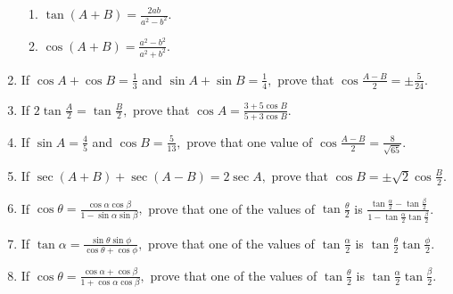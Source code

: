 \begin{enumerate}[resume]
  \begin{enumerate}
  \item $\tan(A + B) = \frac{2ab}{a^2 - b^2}$.
  \item $\cos(A + B) = \frac{a^2 - b^2}{a^2 + b^2}$.
  \end{enumerate}
\item If $\cos A + \cos B = \frac{1}{3}$ and $\sin A + \sin B = \frac{1}{4},$ prove that $\cos \frac{A - B}{2} =
  \pm\frac{5}{24}$.
\item If $2\tan \frac{A}{2} = \tan \frac{B}{2},$ prove that $\cos A = \frac{3 + 5\cos B}{5 + 3\cos B}$.
\item If $\sin A = \frac{4}{5}$ and $\cos B = \frac{5}{13},$ prove that one value of $\cos \frac{A - B}{2} =
  \frac{8}{\sqrt{65}}$.
\item If $\sec(A + B) + \sec(A - B) = 2\sec A,$ prove that $\cos B = \pm \sqrt{2}\cos \frac{B}{2}$.
\item If $\cos \theta = \frac{\cos\alpha\cos\beta}{1 - \sin\alpha\sin\beta},$ prove that one of the values of $\tan
     \frac{\theta}{2}$ is $\frac{\tan \frac{\alpha}{2} - \tan\frac{\beta}{2}}{1 - \tan\frac{\alpha}{2}\tan\frac{\beta}{2}}$.
\item If $\tan\alpha = \frac{\sin\theta\sin\phi}{\cos\theta + \cos\phi},$ prove that one of the values of
     $\tan\frac{\alpha}{2}$ is $\tan\frac{\theta}{2}\tan\frac{\phi}{2}$.
\item If $\cos\theta = \frac{\cos\alpha + \cos\beta}{1 + \cos\alpha\cos\beta},$ prove that one of the values of
     $\tan\frac{\theta}{2}$ is $\tan\frac{\alpha}{2}\tan\frac{\beta}{2}$.
\end{enumerate}
